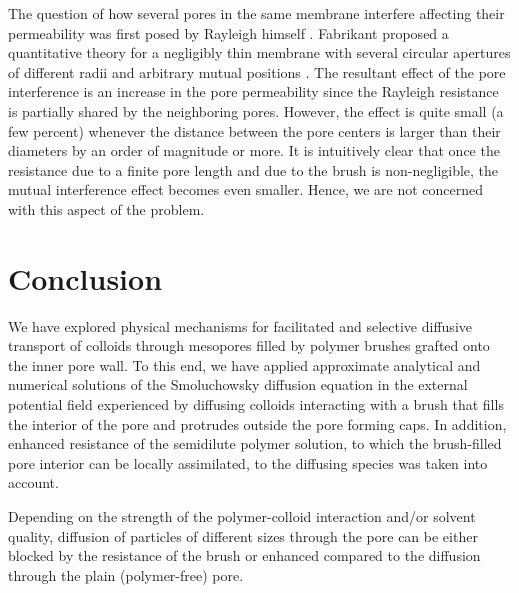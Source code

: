 \documentclass[12pt, a4paper]{article}
\begin{document}
The question of how several pores in the same membrane interfere affecting their permeability was first posed by Rayleigh himself \cite{Strutt1878}. 
Fabrikant  proposed a quantitative theory for a negligibly thin membrane with several circular apertures of different radii and arbitrary mutual positions \cite{Fabrikant1985}. 
The resultant effect of the pore interference is an increase in the pore permeability since the Rayleigh resistance is partially shared by the neighboring pores. 
However, the effect is quite small (a few percent) whenever the distance between the pore centers is larger than their diameters by an order of magnitude or more. 
It is intuitively clear that once the resistance due to a finite pore length and due to the brush is non-negligible, the mutual interference effect 
becomes even smaller. Hence, we are not concerned with this aspect of the problem.



\section{Conclusion}


We have explored physical mechanisms for facilitated and selective diffusive transport of colloids through mesopores filled by polymer brushes grafted onto the inner pore wall. 
To this end, we have applied approximate analytical and numerical solutions of the Smoluchowsky diffusion equation 
in the external potential field experienced by diffusing colloids interacting with a brush that fills the interior of the pore
and protrudes outside the pore forming caps. In addition, enhanced resistance of the semidilute polymer solution, to which the brush-filled pore
interior can be locally assimilated, to the diffusing species was taken into account. 

Depending on the strength of the polymer-colloid interaction and/or solvent quality, diffusion of particles of different sizes
through the pore can be either blocked by the resistance of the brush or enhanced compared to the diffusion through the plain (polymer-free) pore. 
\end{document}
